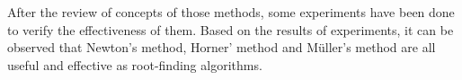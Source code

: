 \documentclass[preprint,12pt]{elsarticle}
\begin{document}
After the review of concepts of those methods, some experiments have been done to verify the effectiveness of them. Based on the results of experiments, it can be observed that Newton's method, Horner' method and M\"uller's method are all useful and effective as root-finding algorithms. 













\end{document}
